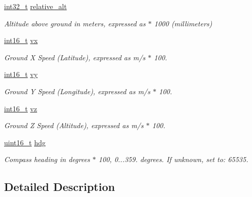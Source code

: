 \begin{DoxyCompactItemize}
\hyperlink{group___n_a_m_e_gafd12020da5a235dfcf0c3c748fb5baed}{int32\-\_\-t} \hyperlink{struct____mavlink__global__position__int__t_a1b3d36234adcacbedc88c37c1712f4b1}{relative\-\_\-alt}
\begin{DoxyCompactList}\small\item\em Altitude above ground in meters, expressed as $\ast$ 1000 (millimeters) \end{DoxyCompactList}\item 
\hyperlink{stdint_8h_aa343fa3b3d06292b959ffdd4c4703b06}{int16\-\_\-t} \hyperlink{struct____mavlink__global__position__int__t_a1f2bef1206e578e3f0f85f7854621829}{vx}
\begin{DoxyCompactList}\small\item\em Ground X Speed (Latitude), expressed as m/s $\ast$ 100. \end{DoxyCompactList}\item 
\hyperlink{stdint_8h_aa343fa3b3d06292b959ffdd4c4703b06}{int16\-\_\-t} \hyperlink{struct____mavlink__global__position__int__t_a89734a8b924f059f9e634233ce021cd3}{vy}
\begin{DoxyCompactList}\small\item\em Ground Y Speed (Longitude), expressed as m/s $\ast$ 100. \end{DoxyCompactList}\item 
\hyperlink{stdint_8h_aa343fa3b3d06292b959ffdd4c4703b06}{int16\-\_\-t} \hyperlink{struct____mavlink__global__position__int__t_ac476cea996cb642f139a93fc7f5ed2a4}{vz}
\begin{DoxyCompactList}\small\item\em Ground Z Speed (Altitude), expressed as m/s $\ast$ 100. \end{DoxyCompactList}\item 
\hyperlink{stdint_8h_a273cf69d639a59973b6019625df33e30}{uint16\-\_\-t} \hyperlink{struct____mavlink__global__position__int__t_a60f7c02018c444cdffb6121dee854e19}{hdg}
\begin{DoxyCompactList}\small\item\em Compass heading in degrees $\ast$ 100, 0...359. degrees. If unknown, set to\-: 65535. \end{DoxyCompactList}\end{DoxyCompactItemize}


\subsection{Detailed Description}


